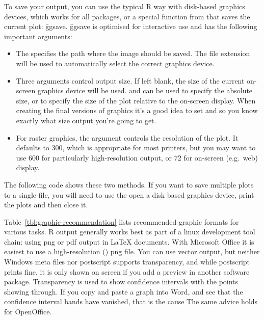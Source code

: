 To save your output, you can use the typical R way with disk-based graphics devices, which works for all packages, or a special function from \ggplot that saves the current plot: \f{ggsave}. \f{ggsave} is optimised for interactive use and has the following important arguments:

\begin{itemize}
  \item The  specifies the path where the image should be saved.  The file extension will be used to automatically select the correct graphics device.
  
  \item Three arguments control output size.  If left blank, the size of the current on-screen graphics device will be used.   and  can be used to specify the absolute size, or  to specify the size of the plot relative to the on-screen display.  When creating the final versions of graphics it's a good idea to set  and  so you know exactly what size output you're going to get.

  \item For raster graphics, the  argument controls the resolution of the plot. It defaults to 300, which is appropriate for most printers, but you may want to use 600 for particularly high-resolution output, or 72 for on-screen (e.g.\ web) display.
  
\end{itemize}

The following code shows these two methods. If you want to save multiple plots to a single file, you will need to use the open a disk based graphics device, print the plots and then close it.

% 
% 


Table~\ref{tbl:graphic-recommendation} lists recommended graphic formats for various tasks.  R output generally works best as part of a linux development tool chain: using png or pdf output in \LaTeX{} documents.  With Microsoft Office it is easiest to use a high-resolution () png file.  You can use vector output, but neither Windows meta files nor postscript supports transparency, and while postscript prints fine, it is only shown on screen if you add a preview in another software package. Transparency is used to show confidence intervals with the points showing through. If you copy and paste a graph into Word, and see that the confidence interval bands have vanished, that is the cause The same advice holds for OpenOffice.

